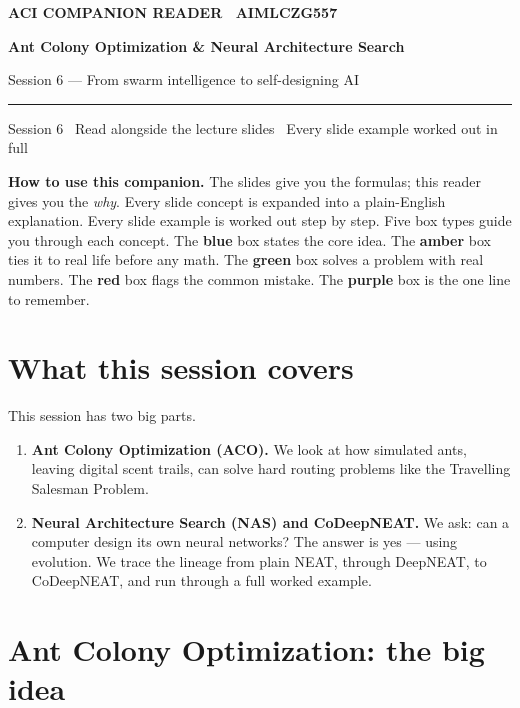 \documentclass[a4paper,11pt]{article}
\providecommand{\addfontfeatureslike}[1]{#1}
\newcommand{\titlebanner}[4]{%
  \begin{tcolorbox}[
    enhanced, breakable=false,
    colback=navy, colframe=navy,
    boxrule=0pt, arc=3pt, outer arc=3pt,
    left=16pt, right=16pt, top=16pt, bottom=16pt,
    before skip=2pt, after skip=14pt,
    width=\linewidth ]
    {\sffamily\footnotesize\bfseries\color{white!85}%
      \MakeUppercase{\addfontfeatureslike{#1}}}\par
    \vspace{6pt}
    {\sffamily\bfseries\fontsize{26}{30}\selectfont\color{white} #2\par}
    \vspace{5pt}
    {\sffamily\large\color{white!88} #3\par}
    \vspace{9pt}
    {\color{white!55}\rule{\linewidth}{0.4pt}}\par
    \vspace{6pt}
    {\sffamily\footnotesize\color{white!82} #4\par}
  \end{tcolorbox}%
}
\begin{document}

\thispagestyle{fancy}

\titlebanner
  {ACI Companion Reader \textperiodcentered\ AIMLCZG557}
  {Ant Colony Optimization \& Neural Architecture Search}
  {Session 6 --- From swarm intelligence to self-designing AI}
  {Session 6 \textperiodcentered\ Read alongside the lecture slides \textperiodcentered\ Every slide example worked out in full}

\noindent\textbf{How to use this companion.}
The slides give you the formulas; this reader gives you the \emph{why}.
Every slide concept is expanded into a plain-English explanation.
Every slide example is worked out step by step.
Five box types guide you through each concept.
The \textcolor{intuFrame}{\textbf{blue}} box states the core idea.
The \textcolor{everyFrame}{\textbf{amber}} box ties it to real life before any math.
The \textcolor{workFrame}{\textbf{green}} box solves a problem with real numbers.
The \textcolor{watchFrame}{\textbf{red}} box flags the common mistake.
The \textcolor{keyFrame}{\textbf{purple}} box is the one line to remember.

\medskip

\section{What this session covers}

This session has two big parts.

\begin{enumerate}
  \item \textbf{Ant Colony Optimization (ACO).}
        We look at how simulated ants, leaving digital scent trails, can
        solve hard routing problems like the Travelling Salesman Problem.
  \item \textbf{Neural Architecture Search (NAS) and CoDeepNEAT.}
        We ask: can a computer design its own neural networks?
        The answer is yes --- using evolution.
        We trace the lineage from plain NEAT, through DeepNEAT, to
        CoDeepNEAT, and run through a full worked example.
\end{enumerate}

\section{Ant Colony Optimization: the big idea}
\end{document}
